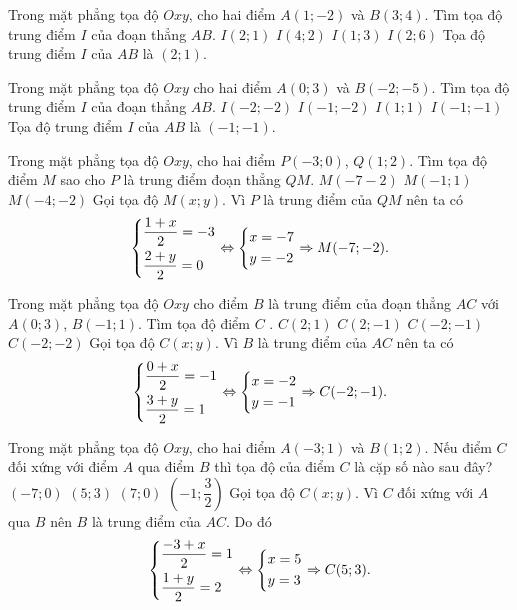 \begin{ex}%
	Trong mặt phẳng tọa độ $Oxy$, cho hai điểm $A(1;-2)$ và $B(3;4)$. Tìm tọa độ trung điểm $I$ của đoạn thẳng $AB$.
	\choice
	{\True $I(2;1)$}
	{$I(4;2)$}
	{$I(1;3)$}
	{$I(2;6)$}
	\loigiai
	{
		Tọa độ trung điểm $I$ của $AB$ là $(2;1)$.
	}	
\end{ex}

\begin{ex}%
	Trong mặt phẳng tọa độ $Oxy$ cho hai điểm $A(0;3)$ và $B(-2;-5)$. Tìm tọa độ trung điểm $I$ của đoạn thẳng $AB$. 
	\choice
	{$I(-2;-2)$}
	{$I(-1;-2)$}
	{$I(1;1)$}
	{\True$I(-1;-1)$}
	\loigiai
	{
		Tọa độ trung điểm $I$ của $AB$ là $(-1;-1)$.
	}	
\end{ex}

\begin{ex}%
	Trong mặt phẳng tọa độ $Oxy$, cho hai điểm $P(-3;0)$, $Q(1;2)$. Tìm tọa độ điểm $M$ sao cho $P$ là trung điểm đoạn thẳng $QM$. 
	{\True $M(-7-2)$}
	{$M(-1;1)$}
	{$M(-4;-2)$}
	\loigiai
	{
		Gọi tọa độ $M(x;y)$. Vì $P$ là trung điểm của $QM$ nên ta có
		\[\left\{\begin{aligned}&\dfrac{1+x}{2}=-3\\ &\dfrac{2+y}{2}=0\end{aligned}\right.\Leftrightarrow \left\{\begin{aligned}&x=-7\\ &y=-2\end{aligned}\right.\Rightarrow M(-7;-2).\]
	}	
\end{ex}

\begin{ex}%
	Trong mặt phẳng tọa độ $Oxy$ cho điểm $B$ là trung điểm của đoạn thẳng $AC$ với $A(0;3)$, $B(-1;1)$. Tìm tọa độ điểm $C$ . 
	\choice
	{$C(2;1)$}
	{$C(2;-1)$}
	{\True $C(-2;-1)$}
	{$C(-2;-2)$}
	\loigiai
	{
		Gọi tọa độ $C(x;y)$. Vì $B$ là trung điểm của $AC$ nên ta có
		\[\left\{\begin{aligned}&\dfrac{0+x}{2}=-1\\ &\dfrac{3+y}{2}=1\end{aligned}\right.\Leftrightarrow \left\{\begin{aligned}&x=-2\\ &y=-1\end{aligned}\right.\Rightarrow C(-2;-1).\]
	}	
\end{ex}

\begin{ex}%
	Trong mặt phẳng tọa độ $Oxy$, cho hai điểm $A(-3;1)$ và $B(1;2)$. Nếu điểm $C$ đối xứng với điểm $A$ qua điểm $B$ thì tọa độ của điểm $C$ là cặp số nào sau đây?
	\choice
	{$(-7;0)$}
	{\True $(5;3)$}
	{$(7;0)$}
	{$\left(-1;\dfrac{3}{2}\right)$}
	\loigiai
	{
		Gọi tọa độ $C(x;y)$. Vì $C$ đối xứng với $A$ qua $B$ nên $B$ là trung điểm của $AC$. Do đó
		\[\left\{\begin{aligned}&\dfrac{-3+x}{2}=1\\ &\dfrac{1+y}{2}=2\end{aligned}\right.\Leftrightarrow \left\{\begin{aligned}&x=5\\ &y=3\end{aligned}\right.\Rightarrow C(5;3).\]
	}	
\end{ex}

